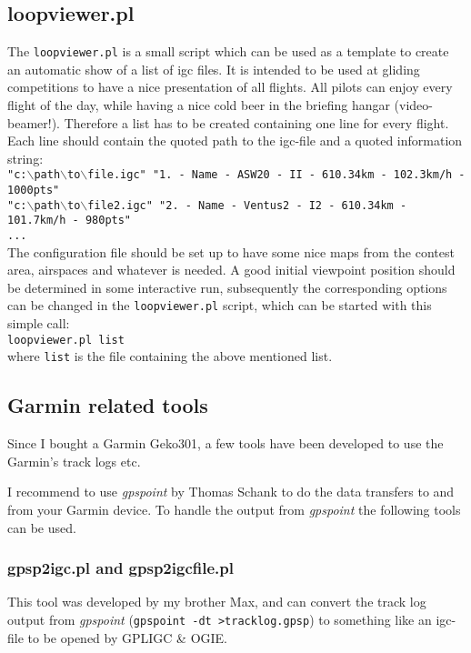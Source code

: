 \subsection{loopviewer.pl}
The \texttt{loopviewer.pl} is a small script which can be used as a template to create an automatic show of a list of igc files.
It is intended to be used at gliding competitions to have a nice presentation of all flights. All pilots can enjoy every flight of the day, while having a nice cold beer in the briefing hangar (video-beamer!).
Therefore a list has to be created containing one line for every flight. Each line should contain the quoted path to the igc-file and a quoted information string: \\
\texttt{"c:$\backslash$path$\backslash$to$\backslash$file.igc"   "1. - Name - ASW20 - II - 610.34km - 102.3km/h - 1000pts"} \\
\texttt{"c:$\backslash$path$\backslash$to$\backslash$file2.igc"  "2. - Name - Ventus2 - I2 - 610.34km - 101.7km/h - 980pts"} \\
\texttt{...} \\
The configuration file should be set up to have some nice maps from the contest area, airspaces and whatever is needed. A good initial viewpoint position should be determined in some interactive run, subsequently the corresponding options can be changed in the \texttt{loopviewer.pl} script, which can be started with this simple call: \\
\texttt{loopviewer.pl  list} \\
where \texttt{list} is the file containing the above mentioned list.




\subsection{Garmin related tools}

Since I bought a Garmin Geko301, a few tools have been developed to use the Garmin's track logs etc.

I recommend to use \emph{gpspoint}  by Thomas Schank to do the data transfers to and from your Garmin device.
To handle the output from \emph{gpspoint} the following tools can be used.

\subsubsection{gpsp2igc.pl and gpsp2igcfile.pl}
\label{gpsp2igc}
This tool was developed by my brother Max, and can convert the track log output from \emph{gpspoint} (\texttt{gpspoint -dt >tracklog.gpsp})
to something like an igc-file to be opened by GPLIGC \& OGIE.

